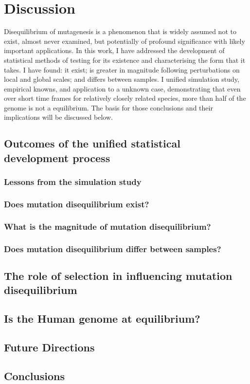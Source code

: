 \chapter{Discussion}

Disequilibrium of mutagenesis is a phenomenon that is widely assumed not to exist, almost never examined, but potentially of profound significance with likely important applications. In this work, I have addressed the development of statistical methods of testing for its existence and characterising the form that it takes. I have found: it exist; is greater in magnitude following perturbations on local and global scales; and differs between samples. I unified simulation study, empirical knowns, and application to a unknown case, demonstrating that even over short time frames for relatively closely related species, more than half of the genome is not a equilibrium. The basis for those conclusions and their implications will be discussed below. 

\section{Outcomes of the unified statistical development process}

\subsection{Lessons from the simulation study}

\subsection{Does mutation disequilibrium exist?}

\subsection{What is the magnitude of mutation disequilibrium?}

\subsection{Does mutation disequilibrium differ between samples?}

\section{The role of selection in influencing mutation disequilibrium}

\section{Is the Human genome at equilibrium?}

\section{Future Directions}

\section{Conclusions}